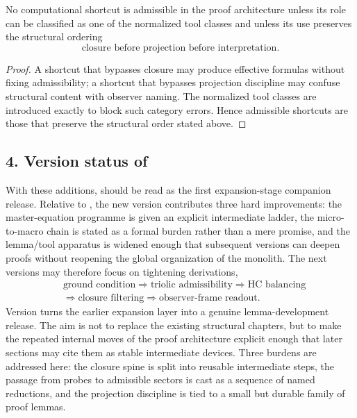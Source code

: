 \begin{corollary}
\label{cor:tool-usage-discipline}
No computational shortcut is admissible in the proof architecture unless its
role can be classified as one of the normalized tool classes and unless its use
preserves the structural ordering
\[
\text{closure before projection before interpretation}.
\]
\end{corollary}

\begin{proof}
A shortcut that bypasses closure may produce effective formulas without fixing
admissibility; a shortcut that bypasses projection discipline may confuse
structural content with observer naming. The normalized tool classes are
introduced exactly to block such category errors. Hence admissible shortcuts are
those that preserve the structural order stated above.
\end{proof}

\subsection*{4. Version status of }
With these additions,  should be read as the first expansion-stage
companion release. Relative to , the new version contributes three hard
improvements: the master-equation programme is given an explicit intermediate
ladder, the micro-to-macro chain is stated as a formal burden rather than a
mere promise, and the lemma/tool apparatus is widened enough that subsequent
versions can deepen proofs without reopening the global organization of the
monolith. The next versions may therefore focus on tightening derivations,
\[
\begin{aligned}
&\text{ground condition}
\Longrightarrow
\text{triolic admissibility}
\Longrightarrow
\text{HC balancing}
\\[0.2em]
&\Longrightarrow
\text{closure filtering}
\Longrightarrow
\text{observer-frame readout}.
\end{aligned}
\]
Version  turns the earlier expansion layer into a genuine
lemma-development release. The aim is not to replace the existing structural
chapters, but to make the repeated internal moves of the proof architecture
explicit enough that later sections may cite them as stable intermediate
devices. Three burdens are addressed here: the closure spine is split into
reusable intermediate steps, the passage from probes to admissible sectors is
cast as a sequence of named reductions, and the projection discipline is tied
to a small but durable family of proof lemmas.



